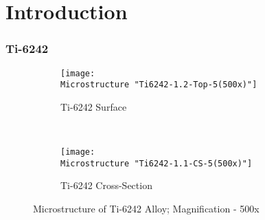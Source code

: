 \chapter{Introduction}

\subsection{Ti-6242}

\begin{figure}[H]
    \centering
    \begin{subfigure}{0.49\textwidth}
        \texttt{[image: \\Microstructure "Ti6242-1.2-Top-5(500x)"]}
        \caption{Ti-6242 Surface}
        \label{fig:Ti-6242 Surface}
    \end{subfigure}
    ~
    \begin{subfigure}{0.49\textwidth}
        \texttt{[image: \\Microstructure "Ti6242-1.1-CS-5(500x)"]}
        \caption{Ti-6242 Cross-Section}
        \label{fig:Ti-6242 Cross-Section}
    \end{subfigure}
  
    \caption{Microstructure of Ti-6242 Alloy; Magnification - 500x}
    \label{fig:As-Received}
\end{figure}

\iffalse
\begin{figure}[H]
    \centering
    \begin{subfigure}{0.49\textwidth}
        \texttt{[image: \\Microstructure "Ti6246-1.1-Top (1000x)"]}
        \caption{Ti-6246 Surface}
        \label{fig:2a}
    \end{subfigure}
    ~
    \begin{subfigure}{0.49\textwidth}
        \texttt{[image: \\Microstructure "Ti6246-1.1.1-CS (1000x)"]}
        \caption{Ti-6246 Cross-Section}
        \label{fig:2a}
    \end{subfigure}
  
    \caption{SEM Microstructure of Ti-6246 Alloy; Magnification - 1000x}
    \label{fig:As-Received-SEM}
\end{figure}

\fi